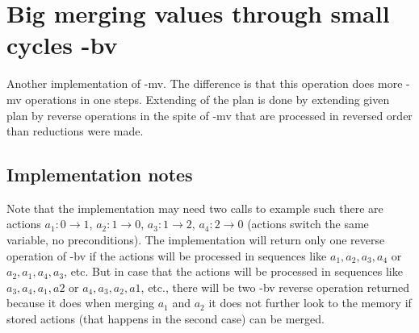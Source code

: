 	\chapter{Big merging values through small cycles -bv}
	
	Another implementation of -mv. The difference is that this operation does more -mv operations in one steps. Extending of the plan is done by extending given plan by reverse operations in the spite of -mv that are processed in reversed order than reductions were made.
	
	\section{Implementation notes}
	Note that the implementation may need two calls to example such there are actions $a_1:0 \rightarrow 1$, $a_2:1 \rightarrow 0$, $a_3:1 \rightarrow 2$, $a_4:2 \rightarrow 0$ (actions switch the same variable, no preconditions). The implementation will return only one reverse operation of -bv if the actions will be processed in sequences like $a_1, a_2, a_3, a_4$ or $a_2, a_1, a_4, a_3$, etc. But in case that the actions will be processed in sequences like $a_3, a_4, a_1, a2$ or $a_4, a_3, a_2, a1$, etc., there will be two -bv reverse operation returned because it does when merging $a_1$ and $a_2$ it does not further look to the memory if stored actions (that happens in the second case) can be merged.
	
	
	